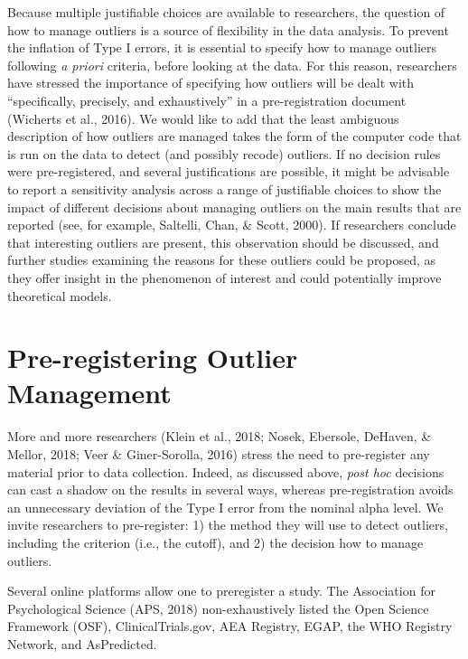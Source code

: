 \documentclass[man,floatsintext]{apa6}
\begin{document}
Because multiple justifiable choices are available to researchers, the question of how to manage outliers is a source of flexibility in the data analysis. To prevent the inflation of Type I errors, it is essential to specify how to manage outliers following \emph{a priori} criteria, before looking at the data. For this reason, researchers have stressed the importance of specifying how outliers will be dealt with \enquote{specifically, precisely, and exhaustively} in a pre-registration document (Wicherts et al., 2016). We would like to add that the least ambiguous description of how outliers are managed takes the form of the computer code that is run on the data to detect (and possibly recode) outliers. If no decision rules were pre-registered, and several justifications are possible, it might be advisable to report a sensitivity analysis across a range of justifiable choices to show the impact of different decisions about managing outliers on the main results that are reported (see, for example, Saltelli, Chan, \& Scott, 2000). If researchers conclude that interesting outliers are present, this observation should be discussed, and further studies examining the reasons for these outliers could be proposed, as they offer insight in the phenomenon of interest and could potentially improve theoretical models.

\hypertarget{pre-registering-outlier-management}{%
\section{Pre-registering Outlier Management}\label{pre-registering-outlier-management}}

More and more researchers (Klein et al., 2018; Nosek, Ebersole, DeHaven, \& Mellor, 2018; Veer \& Giner-Sorolla, 2016) stress the need to pre-register any material prior to data collection. Indeed, as discussed above, \emph{post hoc} decisions can cast a shadow on the results in several ways, whereas pre-registration avoids an unnecessary deviation of the Type I error from the nominal alpha level. We invite researchers to pre-register:
1) the method they will use to detect outliers, including the criterion (i.e., the cutoff), and 2) the decision how to manage outliers.

Several online platforms allow one to preregister a study. The Association for Psychological Science (APS, 2018) non-exhaustively listed the Open Science Framework (OSF), ClinicalTrials.gov, AEA Registry, EGAP, the WHO Registry Network, and AsPredicted.
\end{document}
